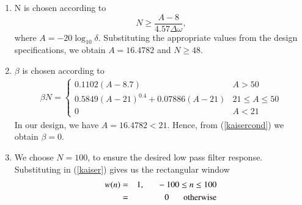 \documentclass{article}
\begin{document}
\begin{enumerate}
\item  N is chosen according to
\begin{equation}
N \geq \frac{A-8}{4.57\Delta \omega},
\end{equation}
where $A = -20\log_{10}\delta$.  Substituting the appropriate values from the design specifications, we obtain
$A = 16.4782$ and $N \geq 48$.

\item  $\beta$ is chosen according to
\begin{eqnarray}
\label{kaisercond}
\beta N = \left\{ \begin{array}{ll} 0.1102(A-8.7) & A > 50 \\
0.5849(A-21)^{0.4}+ 0.07886(A-21) & 21 \leq A \leq 50 \\
0 & A < 21\end{array} \right.
\end{eqnarray}
In our design, we have $A = 16.4782 < 21$.  Hence, from (\ref{kaisercond}) we obtain $\beta = 0$.  

\item We choose $N = 100$, to ensure the desired low pass filter response.  Substituting in (\ref{kaiser})
gives us the rectangular window
\begin{eqnarray}
\label{rect}
w(n) &=& 1, \indent -100 \leq n \leq 100 \nonumber \\
&=& 0 \hspace{6mm} \mbox{otherwise}
\end{eqnarray}
\end{enumerate}
\end{document}

